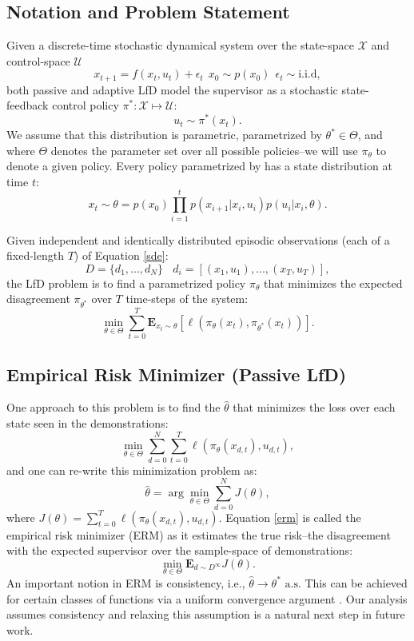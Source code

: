 \subsection{Notation and Problem Statement}
Given a discrete-time stochastic dynamical system over the state-space $\mathcal{X}$ and control-space $\mathcal{U}$
\begin{equation}
x_{t+1} = f(x_t,u_t) + \epsilon_t~~x_0\sim p(x_0)~~\epsilon_t \sim \text{i.i.d}, \label{sde}
\end{equation}
both passive and adaptive LfD model the supervisor as a stochastic state-feedback control policy $\pi^*: \mathcal{X} \mapsto \mathcal{U}$:
\[
u_{t} \sim \pi^*(x_t).
\]
We assume that this distribution is parametric, parametrized by $\theta^* \in \Theta$, and where $\Theta$ denotes the parameter set over all possible policies--we will use $\pi_{\theta}$ to denote a given policy.  
Every policy parametrized by has a state distribution at time $t$:
\[x_t \sim \theta =  p(x_0) \prod^t_{i=1} p(x_{i+1}|x_{i},u_{i})p(u_i|x_i,\theta).\]

Given independent and identically distributed episodic observations (each of a fixed-length $T$) of Equation \ref{sde}:
\[
D = \{d_1,...,d_N\}~~~~d_i = [(x_1,u_1),...,(x_T,u_T)],
\]
the LfD problem is to find a parametrized policy $\pi_{\theta}$ that minimizes the expected disagreement $\pi_{\theta^*}$ over $T$ time-steps of the system:
\begin{equation}
\min_{\theta \in \Theta} \sum_{t=0}^T \mathbf{E}_{x_t \sim \theta} [ \ell(\pi_{\theta}(x_t), \pi_{\theta^*}(x_t))]. \label{obj}
\end{equation}

\subsection{Empirical Risk Minimizer (Passive LfD)}
One approach to this problem is to find the $\hat{\theta}$ that minimizes the loss over each state seen in the demonstrations:
\[
\min_{\theta \in \Theta} \sum_{d=0}^N \sum_{t=0}^T \ell(\pi_{\theta}(x_{d,t}), u_{d,t}),
\]
and one can re-write this minimization problem as:
\begin{equation}
\hat{\theta} = \arg\min_{\theta \in \Theta} \sum_{d=0}^N  J(\theta),\label{erm}
\end{equation}
where $J(\theta) = \sum_{t=0}^T \ell(\pi_{\theta}(x_{d,t}), u_{d,t})$.
Equation \ref{erm} is called the empirical risk minimizer (ERM) as it estimates the true risk--the disagreement with the expected supervisor over the sample-space of demonstrations:
\[
\min_{\theta \in \Theta} \mathbf{E}_{d \sim D^\infty}  J(\theta).
\]
An important notion in ERM is consistency, i.e., $\hat{\theta} \rightarrow \theta^* \text{ a.s}$. This can be achieved for certain classes of functions via a uniform convergence argument .
Our analysis assumes consistency and relaxing this assumption is a natural next step in future work.

